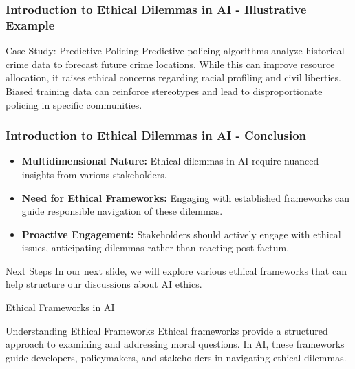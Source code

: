 \documentclass[aspectratio=169]{beamer}
\begin{document}
\begin{frame}[fragile]
    \frametitle{Introduction to Ethical Dilemmas in AI - Illustrative Example}
    \begin{block}{Case Study: Predictive Policing}
        Predictive policing algorithms analyze historical crime data to forecast future crime locations. While this can improve resource allocation, it raises ethical concerns regarding racial profiling and civil liberties. Biased training data can reinforce stereotypes and lead to disproportionate policing in specific communities.
    \end{block}
\end{frame}

\begin{frame}[fragile]
    \frametitle{Introduction to Ethical Dilemmas in AI - Conclusion}
    \begin{itemize}
        \item \textbf{Multidimensional Nature:} Ethical dilemmas in AI require nuanced insights from various stakeholders. 
        \item \textbf{Need for Ethical Frameworks:} Engaging with established frameworks can guide responsible navigation of these dilemmas.
        \item \textbf{Proactive Engagement:} Stakeholders should actively engage with ethical issues, anticipating dilemmas rather than reacting post-factum.
    \end{itemize}
    \begin{block}{Next Steps}
        In our next slide, we will explore various ethical frameworks that can help structure our discussions about AI ethics.
    \end{block}
\end{frame}

\begin{frame}[fragile]{Ethical Frameworks in AI}
    \begin{block}{Understanding Ethical Frameworks}
        Ethical frameworks provide a structured approach to examining and addressing moral questions. In AI, these frameworks guide developers, policymakers, and stakeholders in navigating ethical dilemmas.
    \end{block}
\end{frame}
\end{document}
